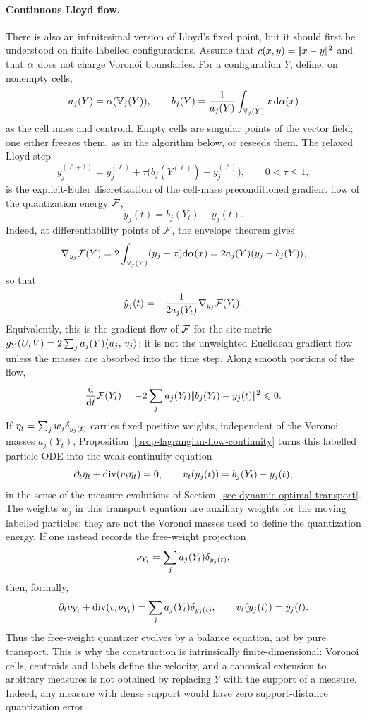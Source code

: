 \paragraph{Continuous Lloyd flow.}
There is also an infinitesimal version of Lloyd's fixed point, but it should first be understood on finite labelled configurations. Assume that \(c(x,y)=|\!| x-y |\!|^2\) and that \(\alpha\) does not charge Voronoi boundaries. For a configuration \(Y\), define, on nonempty cells,
\[
	a_j(Y)=\alpha(\mathbb{V}_j(Y)),
	\qquad
	b_j(Y)=\frac{1}{a_j(Y)}\int_{\mathbb{V}_j(Y)}x\,\mathrm{d}\alpha(x)
\]
as the cell mass and centroid. Empty cells are singular points of the vector field; one either freezes them, as in the algorithm below, or reseeds them. The relaxed Lloyd step
\[
	y_j^{(\ell+1)}=y_j^{(\ell)}+\tau\big(b_j(Y^{(\ell)})-y_j^{(\ell)}\big),
	\qquad 0<\tau\leq 1,
\]
is the explicit-Euler discretization of the cell-mass preconditioned gradient flow of the quantization energy \(\mathcal{F}\),
\[
	\dot y_j(t)=b_j(Y_t)-y_j(t).
\]
Indeed, at differentiability points of \(\mathcal{F}\), the envelope theorem gives
\[
	\nabla_{y_j}\mathcal{F}(Y)
	=
	2\int_{\mathbb{V}_j(Y)}(y_j-x)\mathrm{d}\alpha(x)
	=
	2a_j(Y)(y_j-b_j(Y)),
\]
so that
\[
	\dot y_j(t)
	=
	-\frac{1}{2a_j(Y_t)}\nabla_{y_j}\mathcal{F}(Y_t).
\]
Equivalently, this is the gradient flow of \(\mathcal{F}\) for the site metric \(g_Y(U,V)=2\sum_j a_j(Y)\langle u_j,\,v_j\rangle\); it is not the unweighted Euclidean gradient flow unless the masses are absorbed into the time step. Along smooth portions of the flow,
\[
	\frac{\mathrm{d}}{\mathrm{d} t}\mathcal{F}(Y_t)
	=
	-2\sum_j a_j(Y_t)|\!| b_j(Y_t)-y_j(t) |\!|^2
	\leqslant 0.
\]
If \(\eta_t=\sum_j w_j\delta_{y_j(t)}\) carries fixed positive weights, independent of the Voronoi masses \(a_j(Y_t)\), Proposition~\ref{prop-lagrangian-flow-continuity} turns this labelled particle ODE into the weak continuity equation
\[
	\partial_t\eta_t+\operatorname{div}(v_t\eta_t)=0,
	\qquad
	v_t(y_j(t))=b_j(Y_t)-y_j(t),
\]
in the sense of the measure evolutions of Section~\ref{sec-dynamic-optimal-transport}. The weights \(w_j\) in this transport equation are auxiliary weights for the moving labelled particles; they are not the Voronoi masses used to define the quantization energy. If one instead records the free-weight projection
\[
	\nu_{Y_t}=\sum_j a_j(Y_t)\delta_{y_j(t)},
\]
then, formally,
\[
	\partial_t\nu_{Y_t}+\operatorname{div}(v_t\nu_{Y_t})
	=
	\sum_j \dot a_j(Y_t)\delta_{y_j(t)},
	\qquad
	v_t(y_j(t))=\dot y_j(t).
\]
Thus the free-weight quantizer evolves by a balance equation, not by pure transport. This is why the construction is intrinsically finite-dimensional: Voronoi cells, centroids and labels define the velocity, and a canonical extension to arbitrary measures is not obtained by replacing \(Y\) with the support of a measure. Indeed, any measure with dense support would have zero support-distance quantization error.


